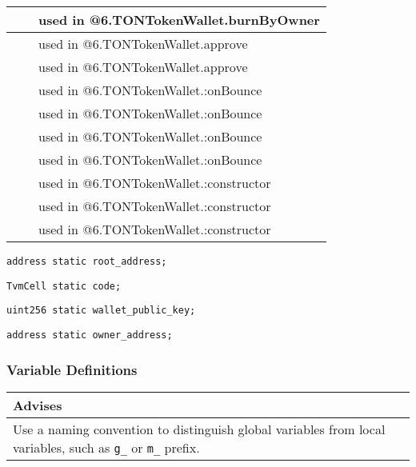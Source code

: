 \begin{tabular}{|l|l|p{5cm}|}
 & & used in @6.TONTokenWallet.burnByOwner\\\hline
 & & used in @6.TONTokenWallet.approve\\\hline
 & & used in @6.TONTokenWallet.approve\\\hline
 & & used in @6.TONTokenWallet.:onBounce\\\hline
 & & used in @6.TONTokenWallet.:onBounce\\\hline
 & & used in @6.TONTokenWallet.:onBounce\\\hline
 & & used in @6.TONTokenWallet.:onBounce\\\hline
 & & used in @6.TONTokenWallet.:constructor\\\hline
 & & used in @6.TONTokenWallet.:constructor\\\hline
 & & used in @6.TONTokenWallet.:constructor\\\hline
\end{tabular}
\fi


\begin{lstlisting}[firstnumber=24]
    address static root_address;
\end{lstlisting}

\begin{lstlisting}[firstnumber=25]
    TvmCell static code;
\end{lstlisting}

\begin{lstlisting}[firstnumber=27]
    uint256 static wallet_public_key;
\end{lstlisting}

\begin{lstlisting}[firstnumber=29]
    address static owner_address;
\end{lstlisting}

\subsubsection{Variable Definitions}


\ifsoldraft
\noindent\begin{tabular}{|p{12cm}|}\hline
\rowcolor{green}Advises
\\\hline
Use a naming convention to distinguish global variables from local variables, such as \verb+g_+ or \verb+m_+ prefix.
\\\hline\end{tabular}
\fi

